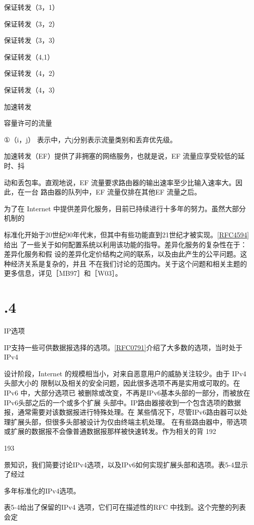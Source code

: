 保证转发（3，1）

保证转发（3，2）

保证转发（3，3）

保证转发（4,1）

保证转发（4，2）

保证转发（4，3）

加速转发

容量许可的流量

①（i，j） 表示中，六j分别表示流量类别和丢弃优先级。

加速转发（EF）提供了非拥塞的网络服务，也就是说，EF 流量应享受较低的延时、抖

动和丢包率。直观地说，EF 流量要求路由器的输出速率至少比输入速率大。因此，在一台
路由器的队列中，EF 流量仅排在其他EF 流量之后。

为了在 Internet 中提供差异化服务，目前已持续进行十多年的努力。虽然大部分机制的

标准化开始于20世纪90年代末，但其中有些功能直到21世纪才被实现。\href{https://www.rfc-editor.org/rfc/rfc4594}{[RFC4594]}给出
了一些关于如何配置系统以利用该功能的指导。差异化服务的复杂性在于：差异化服务和假
设的差异化定价结构之间的联系，以及由此产生的公平问题。这种经济关系是复杂的，并且
不在我们讨论的范围内。关于这个问题和相关主题的更多信息，详见［MB97］和［W03］。

\section{.4}
IP选项

IP支持一些可供数据报选择的选项。\href{https://www.rfc-editor.org/rfc/rfc0791}{[RFC0791]}介绍了大多数的选项，当时处于IPv4

设计阶段，Internet 的规模相当小，对来自恶意用户的威胁关注较少。由于 IPv4 头部大小的
限制以及相关的安全问题，因此很多选项不再是实用或可取的。在IPv6 中，大部分选项已
被删除或改变，不再是IPv6基本头部的一部分，而被放在IPv6头部之后的一个或多个扩展
头部中。IP路由器接收到一个包含选项的数据报，通常需要对该数据报进行特殊处理。在
某些情况下，尽管IPv6路由器可以处理扩展头部，但很多头部被设计为仅由终端主机处理。
在有些路由器中，带选项或扩展的数据报不会像普通数据报那样被快速转发。作为相关的背
192

193

景知识，我们简要讨论IPv4选项，以及IPv6如何实现扩展头部和选项。表5-4显示了经过

多年标准化的IPv4选项。

表5-4给出了保留的IPv4 选项，它们可在描述性的RFC 中找到。这个完整的列表会定

